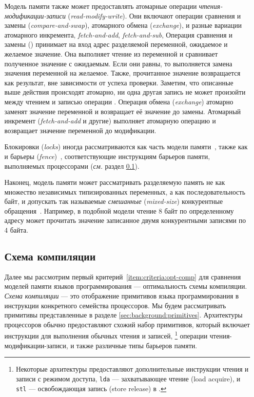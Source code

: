 Модель памяти также может предоставлять атомарные операции 
\emph{чтения-модификации-записи} (\emph{read-modify-write}).
Они включают операции сравнения и замены (\emph{compare-and-swap}), 
атомарного обмена (\emph{exchange}), и разные вариации атомарного инкремента, 
\eg \emph{fetch-and-add}, \emph{fetch-and-sub}, \etc 
Операция сравнения и замены (\CAS) принимает на вход 
адрес разделяемой переменной, ожидаемое и желаемое значение.
Она выполняет чтение из переменной и сравнивает полученное значение 
с ожидаемым. Если они равны, то выполняется замена значения переменной 
на желаемое. Также, прочитанное значение возвращается как результат, 
вне зависимости от успеха проверки. 
Заметим, что описанные выше действия происходят атомарно, 
ни одна другая запись не может произойти между 
чтением и записью операции \CAS.
Операция обмена (\emph{exchange}) атомарно 
заменят значение переменной и возвращает её 
значение до замены. 
Атомарный инкремент (\emph{fetch-and-add} и другие) выполняет
атомарную операцию и возвращает значение переменной до модификации.  

Блокировки (\emph{locks}) иногда рассматриваются 
как часть модели памяти~\cite{Manson-al:POPL05}, 
также как и барьеры (\emph{fence})~\cite{Batty-al:POPL11},
соответствующие инструкциям барьеров памяти, 
выполняемых процессорами  
(\emph{см.} раздел \cref{sec:background:compile}). 

Наконец, модель памяти может рассматривать разделяемую память 
не как множество независимых типизированных переменных, 
а как последовательность байт, и допускать 
так называемые \emph{смешанные} (\emph{mixed-size}) 
конкурентные обращения~\cite{Flur-al:POPL17}. 
Например, в подобной модели чтение 8 байт по определенному адресу
может прочитать значение записанное двумя конкурентными 
записями по 4 байта.

\subsection{Схема компиляции}
\label{sec:background:compile}

Далее мы рассмотрим первый критерий~\ref{item:criteria:opt-comp}
для сравнения моделей памяти языков программирования --- 
оптимальность схемы компиляции. 
\emph{Схема компиляции} --- это отображение
примитивов языка программирования в инструкции 
конкретного семейства процессоров.  
Мы будем рассматривать примитивы представленные в 
разделе \cref{sec:background:primitives}.
Архитектуры процессоров обычно предоставляют 
схожий набор примитивов, который включает 
инструкции для выполнения обычных чтения и записей,%
\footnote{Некоторые архитектуры
предоставляют дополнительные инструкции чтения и 
записи с режимом доступа, \eg 
\eg \texttt{lda} --- захватывающее чтение (load acquire), 
и \texttt{stl} --- освобождающая запись (store release) в .} 
операции чтения-модификации-записи, и 
также различные типы барьеров памяти.


